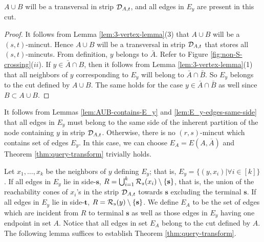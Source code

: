 \begin{lemma}
$A\cup B$ will be a transversal in strip ${\cal D}_{A,t}$, and all edges in $E_y$ are present in this cut.

\label{lem:AUB-contains-E_y}
\end{lemma}
\begin{proof}
It follows from Lemma \ref{lem:3-vertex-lemma}(3) that $A\cup B$ will be a $(s,t)$-mincut. Hence $A\cup B$ will be a transversal in strip ${\cal D}_{A,t}$ that stores all
$(s,t)$-mincuts.
From definition, $y$ belongs to $\bar{A}$. Refer to Figure \ref{fig:non-S-crossing}($ii$).  If $y\in \bar{A}\cap B$, then it follows from Lemma \ref{lem:3-vertex-lemma}(1) that all neighbors of $y$ corresponding to $E_y$ will belong to $\bar{A}\cap \bar{B}$. So $E_y$ belongs to the cut defined by $A\cup B$. The same holds for the case $y\in \bar{A}\cap\bar{B}$ as well since $B\subset A\cup B$.
\end{proof}


It follows from Lemmas \ref{lem:AUB-contains-E_y} and \ref{lem:E_y-edges-same-side} that all edges in $E_y$ must belong to the same side of the inherent partition of the node containing $y$ in strip ${\cal D}_{A,t}$. 
Otherwise, there is no $(r,s)$-mincut which contains set of edges $E_y$. In this case, we can choose $E_A = E(A,{\overline A})$ and Theorem \ref{thm:query-transform} trivially holds.

Let $x_1,\ldots,x_k$ be the neighbors of $y$ defining $E_y$; that is, $E_y = \{(y,x_i)|
\forall i\in [k]\}$. 
If all edges in $E_y$ lie in side-$\mathbf{s}$,
$R=\bigcup_{i=1}^{k}{\cal R}_s(x_i) \setminus \{\mathbf{s}\}$, that is, the union of the reachability cones of $x_i$'s in the strip ${\cal D}_{A,t}$ towards $\mathbf{s}$ excluding the terminal ${\mathbf{s}}$. If all edges in $E_y$ lie in side-$\mathbf{t}$,
$R={\cal R}_s(y) \setminus \{\mathbf{s}\}$.
We define $E_A$ to be the set of edges which are incident from $R$ to terminal $\mathbf{s}$ as well as those edges in $E_y$ having one endpoint in set $A$. Notice that all edges in set $E_A$
belong to the cut defined by $A$. The following lemma suffices to establish Theorem  \ref{thm:query-transform}.

